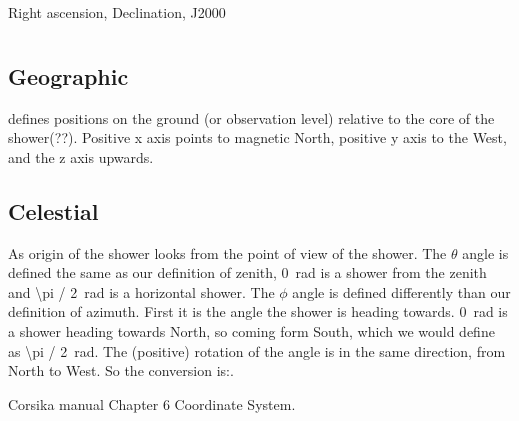 Right ascension, Declination, J2000


\section{\corsika}

\subsection{Geographic}

\corsika defines positions on the ground (or observation level) relative
to the core of the shower(??). Positive x axis points to magnetic North,
positive y axis to the West, and the z axis upwards.


\subsection{Celestial}

As origin of the shower \corsika looks from the point of view of the
shower. The $\theta$ angle is defined the same as our definition of
zenith, \SI{0}{\radian} is a shower from the zenith and
\SI{\pi / 2}{\radian} is a horizontal shower. The $\phi$ angle is
defined differently than our definition of azimuth. First it is the
angle the shower is heading towards. \SI{0}{\radian} is a shower heading
towards North, so coming form South, which we would define as
\SI{\pi / 2}{\radian}. The (positive) rotation of the angle is
in the same direction, from North to West. So the conversion is:.




\begin{thebibliography}{widest-label}
Corsika manual Chapter 6 Coordinate System.

\end{thebibliography}
